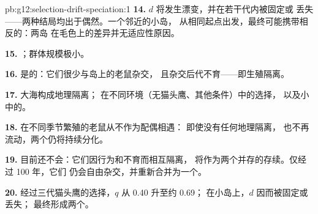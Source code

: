 \begin{solution}{pb:g12:selection-drift-speciation:1}
\textbf{14.} $d$ 将发生漂变，并在若干代内被固定或
丢失——两种结局均出于偶然。一个邻近的小岛，
从相同起点出发，最终可能携带相反的：两岛
在毛色上的差异并无适应性原因。

\textbf{15.} ；群体规模极小。

\textbf{16.} 是的：它们很少与岛上的老鼠杂交，
且杂交后代不育——即生殖隔离。

\textbf{17.} 大海构成地理隔离；
在不同环境（无猫头鹰、其他条件）中的选择，
以及小中的。

\textbf{18.} 在不同季节繁殖的老鼠从不作为配偶相遇：
即使没有任何地理隔离，
也不再流动，两个仍将持续分化。

\textbf{19.} 目前还不会：它们因行为和不育而相互隔离，
将作为两个并存的存续。仅经过 100 年，它们
仍会自由杂交，并重新合并为一个。

\textbf{20.} 经过三代猫头鹰的选择，$q$ 从 0.40 升至约 0.69；
在小岛上，$d$ 因而被固定或丢失；
最终形成两个。
\end{solution}
